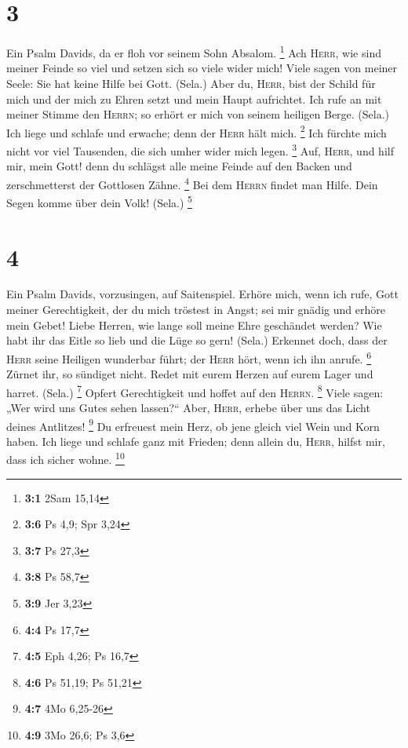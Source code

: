 \hypertarget{section-1}{%
\section{3}\label{section-1}}

 Ein Psalm Davids, da er floh vor seinem Sohn Absalom.
\footnote{\textbf{3:1} 2Sam 15,14}  Ach \textsc{Herr}, wie
sind meiner Feinde so viel und setzen sich so viele wider mich!
 Viele sagen von meiner Seele: Sie hat keine Hilfe bei
Gott. (Sela.)  Aber du, \textsc{Herr}, bist der Schild für
mich und der mich zu Ehren setzt und mein Haupt aufrichtet.
 Ich rufe an mit meiner Stimme den \textsc{Herrn}; so
erhört er mich von seinem heiligen Berge. (Sela.)  Ich
liege und schlafe und erwache; denn der \textsc{Herr} hält mich.
\footnote{\textbf{3:6} Ps 4,9; Spr 3,24}  Ich fürchte mich
nicht vor viel Tausenden, die sich umher wider mich legen. \footnote{\textbf{3:7}
  Ps 27,3}  Auf, \textsc{Herr}, und hilf mir, mein Gott!
denn du schlägst alle meine Feinde auf den Backen und zerschmetterst der
Gottlosen Zähne. \footnote{\textbf{3:8} Ps 58,7}  Bei dem
\textsc{Herrn} findet man Hilfe. Dein Segen komme über dein Volk!
(Sela.) \footnote{\textbf{3:9} Jer 3,23}

\hypertarget{section-2}{%
\section{4}\label{section-2}}

 Ein Psalm Davids, vorzusingen, auf Saitenspiel.
 Erhöre mich, wenn ich rufe, Gott meiner Gerechtigkeit,
der du mich tröstest in Angst; sei mir gnädig und erhöre mein Gebet!
 Liebe Herren, wie lange soll meine Ehre geschändet
werden? Wie habt ihr das Eitle so lieb und die Lüge so gern! (Sela.)
 Erkennet doch, dass der \textsc{Herr} seine Heiligen
wunderbar führt; der \textsc{Herr} hört, wenn ich ihn anrufe.
\footnote{\textbf{4:4} Ps 17,7}  Zürnet ihr, so sündiget
nicht. Redet mit eurem Herzen auf eurem Lager und harret. (Sela.)
\footnote{\textbf{4:5} Eph 4,26; Ps 16,7}  Opfert
Gerechtigkeit und hoffet auf den \textsc{Herrn}. \footnote{\textbf{4:6}
  Ps 51,19; Ps 51,21}  Viele sagen: „Wer wird uns Gutes
sehen lassen?{}`` Aber, \textsc{Herr}, erhebe über uns das Licht deines
Antlitzes! \footnote{\textbf{4:7} 4Mo 6,25-26}  Du
erfreuest mein Herz, ob jene gleich viel Wein und Korn haben.
 Ich liege und schlafe ganz mit Frieden; denn allein du,
\textsc{Herr}, hilfst mir, dass ich sicher wohne. \footnote{\textbf{4:9}
  3Mo 26,6; Ps 3,6}

